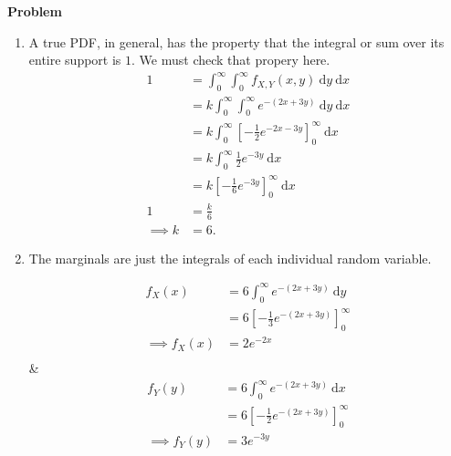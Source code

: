 \documentclass[12pt]{article}
\newenvironment{Ex}{\textbf{Problem}\vspace{.75em}\\}{}
\newcommand{\dd}[1]{\:\mathrm{d}{#1}}
\begin{document}
\begin{enumerate}
\begin{Ex}
\begin{enumerate}
    \end{enumerate}
    \begin{solution} \hfill
      \begin{enumerate}
      \item A true PDF, in general, has the property that the
        integral or sum over its entire support is $1$. We must
        check that propery here.
        \begin{equation}
          \label{eq:6a-sol}
          \begin{aligned}
            1 &= \int_0^\infty \int_0^\infty f_{X,Y}(x,y) \dd{y}
            \dd{x} \\
            &= k \int_0^\infty \int_0^\infty e^{-(2x+3y)} \dd{y}
            \dd{x} \\
            &= k \int_0^\infty
            \left[-\frac{1}{2}e^{-2x-3y}\right]_0^\infty
            \dd{x} \\
            &= k \int_0^\infty \frac{1}{2}e^{-3y} \dd{x} \\
            &= k \left[-\frac{1}{6}e^{-3y}\right]_0^\infty \dd{x} \\
            1 &= \frac{k}{6} \\
            \implies k &= 6.
          \end{aligned}
        \end{equation}
      \item The marginals are just the integrals of each individual
        random variable.
        \begin{multicols}{2}
          \begin{equation}
            \label{eq:5b-marginal-x}
            \begin{aligned}
              f_X(x) &= 6\int_0^\infty e^{-(2x+3y)} \dd{y} \\
              &= 6\left[-\frac{1}{3}e^{-(2x+3y)}\right]_0^\infty \\
              \implies f_X(x) &= 2e^{-2x} \\
            \end{aligned}
          \end{equation} &
          \begin{equation}
            \label{eq:5b-marginal-y}
            \begin{aligned}
              f_Y(y) &= 6\int_0^\infty e^{-(2x+3y)} \dd{x} \\
              &= 6\left[-\frac{1}{2}e^{-(2x+3y)}\right]_0^\infty \\
              \implies f_Y(y) &= 3e^{-3y} \\

\end{aligned}
\end{equation}
\end{multicols}
\end{enumerate}
\end{solution}
\end{Ex}
\end{enumerate}
\end{document}
